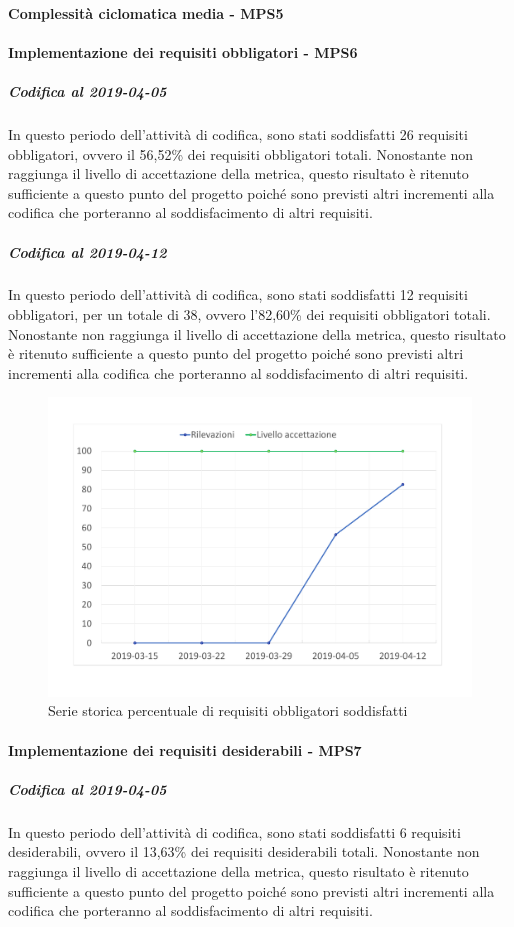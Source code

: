 \paragraph{Complessità ciclomatica media - MPS5}

\paragraph{Implementazione dei requisiti obbligatori - MPS6}
\subparagraph{Codifica al 2019-04-05}
In questo periodo dell'attività di codifica, sono stati soddisfatti 26 requisiti obbligatori, ovvero il 56,52\% dei requisiti obbligatori totali.
Nonostante non raggiunga il livello di accettazione della
metrica, questo risultato è ritenuto sufficiente a questo punto del progetto poiché sono previsti altri incrementi alla codifica che porteranno al soddisfacimento di altri requisiti.

\subparagraph{Codifica al 2019-04-12}
In questo periodo dell'attività di codifica, sono stati soddisfatti 12 requisiti obbligatori, per un totale di 38, ovvero l'82,60\% dei requisiti obbligatori totali.
Nonostante non raggiunga il livello di accettazione della
metrica, questo risultato è ritenuto sufficiente a questo punto del progetto poiché sono previsti altri incrementi alla codifica che porteranno al soddisfacimento di altri requisiti.
\begin{figure}[H]
	\centering
	\includegraphics[scale=0.6]{images/resoconto/MPS6Chart.pdf}
	\caption{Serie storica percentuale di requisiti obbligatori soddisfatti}	
\end{figure}

\paragraph{Implementazione dei requisiti desiderabili - MPS7}
\subparagraph{Codifica al 2019-04-05}
In questo periodo dell'attività di codifica, sono stati soddisfatti 6 requisiti desiderabili, ovvero il 13,63\% dei requisiti desiderabili totali.
Nonostante non raggiunga il livello di accettazione della
metrica, questo risultato è ritenuto sufficiente a questo punto del progetto poiché sono previsti altri incrementi alla codifica che porteranno al soddisfacimento di altri requisiti.

